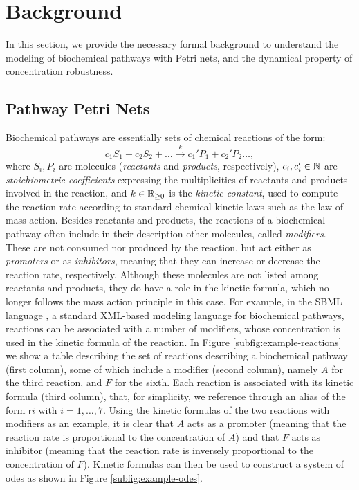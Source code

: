 \section{Background}\label{sect:background}
In this section, we provide the necessary formal background to understand the modeling of biochemical pathways with Petri nets, and the dynamical property of concentration robustness.

\subsection{Pathway Petri Nets}\label{sec:ppn}
Biochemical pathways are essentially sets of chemical reactions of the form:
\[
c_1 S_1 + c_2 S_2 + \ldots
\xrightarrow{k}
c_1' P_1 + c_2' P_2 \ldots,
\]
where $S_i,P_i$ are molecules (\emph{reactants} and \emph{products}, respectively), $c_i, c_i' \in \mathbb{N}$ are \emph{stoichiometric coefficients} expressing the multiplicities of reactants and products involved in the reaction, and $k \in \mathbb{R}_{\geq 0}$ is the \emph{kinetic constant}, used to compute the reaction rate according to standard chemical kinetic laws such as the law of mass action. Besides reactants and products, the reactions of a biochemical pathway often include in their description other molecules, called \emph{modifiers}. These are not consumed nor produced by the reaction, but act either as \emph{promoters} or as \emph{inhibitors}, meaning that they can increase or decrease the reaction rate, respectively. Although these molecules are not listed among reactants and products, they do have a role in the kinetic formula, which no longer follows the mass action principle in this case. For example, in the SBML language \citep{hucka2018sbml}, a standard XML-based modeling language for biochemical pathways, reactions can be associated with a number of modifiers, whose concentration is used in the kinetic formula of the reaction. In Figure \ref{subfig:example-reactions} we show a table describing the set of reactions describing a biochemical pathway (first column), some of which include a modifier (second column), namely $A$ for the third reaction, and $F$ for the sixth. Each reaction is associated with its kinetic formula (third column), that, for simplicity, we reference through an alias of the form $\mathsf{r}i$ with $i = 1, \ldots, 7$. Using the kinetic formulas of the two reactions with modifiers as an example, it is clear that $A$ acts as a promoter (meaning that the reaction rate is proportional to the concentration of $A$) and that $F$ acts as inhibitor (meaning that the reaction rate is inversely proportional to the concentration of $F$). Kinetic formulas can then be used to construct a system of \glspl{ode} as shown in Figure \ref{subfig:example-odes}.

